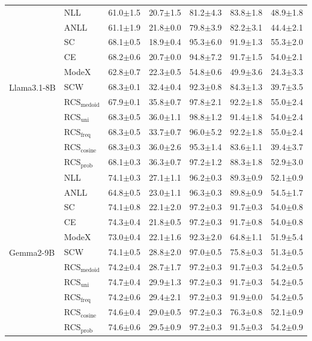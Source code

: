 \begin{table}[t]
{\begin{tabular}{ll|ccccc}
    \multirow{11}{*}{Llama3.1-8B}
    & NLL & 61.0$\pm$1.5	&20.7$\pm$1.5&	81.2$\pm$4.3	&83.8$\pm$1.8&	48.9$\pm$1.8\\
    & ANLL & 61.1$\pm$1.9	&21.8$\pm$0.0	&79.8$\pm$3.9	&82.2$\pm$3.1&	44.4$\pm$2.1\\
    & SC  & 68.1$\pm$0.5	&18.9$\pm$0.4	&95.3$\pm$6.0	&91.9$\pm$1.3&	55.3$\pm$2.0\\
    & CE    & 68.2$\pm$0.6	&20.7$\pm$0.0	&94.8$\pm$7.2	&91.7$\pm$1.5&	54.0$\pm$2.1\\
    & ModeX    & 62.8$\pm$0.7	&22.3$\pm$0.5	&54.8$\pm$0.6	&49.9$\pm$3.6	&24.3$\pm$3.3\\
    & SCW & 68.3$\pm$0.1 & 32.4$\pm$0.4 & 92.3$\pm$0.8 & 84.3$\pm$1.3 & 39.7$\pm$3.5\\

    & RCS$_\text{medoid}$  &67.9$\pm$0.1	&35.8$\pm$0.7	&97.8$\pm$2.1	&92.2$\pm$1.8	&55.0$\pm$2.4\\
    & RCS$_\text{uni}$& 68.3$\pm$0.5	&36.0$\pm$1.1	&98.8$\pm$1.2	&91.4$\pm$1.8	&54.0$\pm$2.4\\
    &  RCS$_\text{freq}$&68.3$\pm$0.5	&33.7$\pm$0.7&	96.0$\pm$5.2&	92.2$\pm$1.8	&55.0$\pm$2.4\\
    & RCS$_\text{cosine}$ & 68.3$\pm$0.3 & 36.0$\pm$2.6 & 95.3$\pm$1.4 & 83.6$\pm$1.1 & 39.4$\pm$3.7\\
    &  RCS$_\text{prob}$  &68.1$\pm$0.3&	36.3$\pm$0.7	&97.2$\pm$1.2	&88.3$\pm$1.8	&52.9$\pm$3.0\\
    \midrule

    \multirow{11}{*}{Gemma2-9B}
    & NLL & 74.1$\pm$0.3	&27.1$\pm$1.1&	96.2$\pm$0.3&	89.3$\pm$0.9&	52.1$\pm$0.9\\
    & ANLL & 64.8$\pm$0.5&	23.0$\pm$1.1	&96.3$\pm$0.3	&89.8$\pm$0.9	&54.5$\pm$1.7\\
    & SC  & 74.1$\pm$0.8	&22.1$\pm$2.0&	97.2$\pm$0.3&	91.7$\pm$0.3	&54.0$\pm$0.8\\
    & CE    & 74.3$\pm$0.4&	21.8$\pm$0.5&	97.2$\pm$0.3&	91.7$\pm$0.8&	54.0$\pm$0.8\\
    & ModeX    & 73.0$\pm$0.4&22.1$\pm$1.6	&92.3$\pm$2.0&	64.8$\pm$1.1	&51.9$\pm$5.4\\
    & SCW & 74.1$\pm$0.5 & 28.8$\pm$2.0 & 97.0$\pm$0.5 & 75.8$\pm$0.3 & 51.3$\pm$0.5\\
    & RCS$_\text{medoid}$  &74.2$\pm$0.4	&28.7$\pm$1.7&	97.2$\pm$0.3&	91.7$\pm$0.3&	54.2$\pm$0.5\\
    & RCS$_\text{uni}$& 74.7$\pm$0.4	&29.9$\pm$1.3	&97.2$\pm$0.3	&91.7$\pm$0.3	&54.2$\pm$0.5\\
    &  RCS$_\text{freq}$&74.2$\pm$0.6&	29.4$\pm$2.1&	97.2$\pm$0.3	&91.9$\pm$0.0&	54.2$\pm$0.5\\
    & RCS$_\text{cosine}$ & 74.6$\pm$0.4 & 29.0$\pm$0.5 & 97.2$\pm$0.3 & 76.3$\pm$0.8 & 52.1$\pm$0.9\\
    &  RCS$_\text{prob}$  &74.6$\pm$0.6	&29.5$\pm$0.9	&97.2$\pm$0.3	&91.5$\pm$0.3	&54.2$\pm$0.9\\
    
    \bottomrule
  \end{tabular}}
\end{table}


